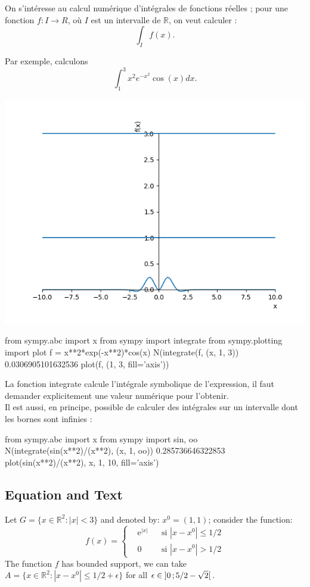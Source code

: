 On s’intéresse au calcul numérique d’intégrales de fonctions réelles ; pour une
fonction $f : I \longrightarrow R$, où $I$ est un intervalle de $\mathbb{R}$, on veut calculer :
\[
\int_{I} f\left(x\right).
\]

Par exemple, calculons
\[
 \int_{1}^{3} x^{2}e^{-x^{2}}\cos\left(x\right) dx.
\] 

\includegraphics[scale=0.6]{../Pictures/Figure_1.png} 
\begin{python}
from sympy.abc import x
from sympy import integrate
from sympy.plotting import plot
f = x**2*exp(-x**2)*cos(x)
N(integrate(f, (x, 1, 3))
0.0306905101632536
plot(f, (1, 3, fill='axis'))
\end{python}

La fonction integrate calcule l’intégrale symbolique de l’expression, il faut
demander explicitement une valeur numérique pour l’obtenir.
\\
Il est aussi, en principe, possible de calculer des intégrales sur un intervalle
dont les bornes sont infinies :
\begin{python}
from sympy.abc import x
from sympy import sin, oo
N(integrate(sin(x**2)/(x**2), (x, 1, oo))
0.285736646322853
plot(sin(x**2)/(x**2), x, 1, 10, fill='axis')
\end{python}

\subsection{Equation and Text}

\begin{example}
Let $G=\{x\in\mathbb{R}^2:|x|<3\}$ and denoted by: $x^0=(1,1)$; consider the function:
\begin{equation}
f(x)=\left\{\begin{aligned} & \mathrm{e}^{|x|} & & \text{si $|x-x^0|\leq 1/2$}\\
& 0 & & \text{si $|x-x^0|> 1/2$}\end{aligned}\right.
\end{equation}
The function $f$ has bounded support, we can take $A=\{x\in\mathbb{R}^2:|x-x^0|\leq 1/2+\epsilon\}$ for all $\epsilon\in\mathopen{]}0\,;5/2-\sqrt{2}\mathclose{[}$.
\end{example}

